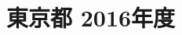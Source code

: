 \documentclass[../../hsm_tok_q.tex]{subfiles}
\begin{document}
    \section{東京都 2016年度}
    \subsection{　}
    
    \newpage
    \subsection{　}
    
    \newpage
    \subsection{　}
    
    \newpage
    \subsection{　}
    
    \newpage
    \subsection{　}
    
\end{document}
